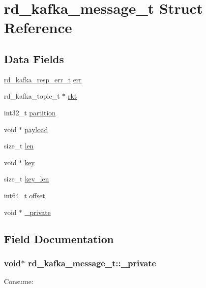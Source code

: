 \hypertarget{structrd__kafka__message__t}{\section{rd\-\_\-kafka\-\_\-message\-\_\-t Struct Reference}
\label{structrd__kafka__message__t}
}
\subsection*{Data Fields}
\begin{DoxyCompactItemize}
\item 
\hyperlink{rdkafka_8h_a03509bab51072c72a8dcf52337e6d5cb}{rd\-\_\-kafka\-\_\-resp\-\_\-err\-\_\-t} \hyperlink{structrd__kafka__message__t_aed08051a31f216cc0369c734493bbc46}{err}
\item 
rd\-\_\-kafka\-\_\-topic\-\_\-t $\ast$ \hyperlink{structrd__kafka__message__t_ad99c2966a73d2a0be7acf101c41d70f1}{rkt}
\item 
int32\-\_\-t \hyperlink{structrd__kafka__message__t_aad65babd39a553e48269e7469e36a09a}{partition}
\item 
void $\ast$ \hyperlink{structrd__kafka__message__t_aa78acb7414a91d7009268e84b1526b7f}{payload}
\item 
size\-\_\-t \hyperlink{structrd__kafka__message__t_a27c4e215c06110e44eec144d449400ae}{len}
\item 
void $\ast$ \hyperlink{structrd__kafka__message__t_a93cbea9d4fb7cfc3e7f546bc5d5f39e2}{key}
\item 
size\-\_\-t \hyperlink{structrd__kafka__message__t_a170276e797dab0eb732db4eecd329a95}{key\-\_\-len}
\item 
int64\-\_\-t \hyperlink{structrd__kafka__message__t_a979bd27da570c93768e474527ddb136e}{offset}
\item 
void $\ast$ \hyperlink{structrd__kafka__message__t_a8eb860a90c978b15892eef54953d5289}{\-\_\-private}
\end{DoxyCompactItemize}


\subsection{Field Documentation}
\hypertarget{structrd__kafka__message__t_a8eb860a90c978b15892eef54953d5289}{
\subsubsection[{\-\_\-private}]{\setlength{\rightskip}{0pt plus 5cm}void$\ast$ rd\-\_\-kafka\-\_\-message\-\_\-t\-::\-\_\-private}}\label{structrd__kafka__message__t_a8eb860a90c978b15892eef54953d5289}
\begin{DoxyVerb}        Consume:
\end{DoxyVerb}

